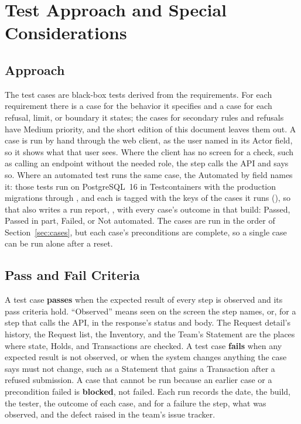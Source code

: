 \section{Test Approach and Special Considerations}\label{sec:approach}

\subsection{Approach}
The test cases are black-box tests derived from the requirements. For each requirement there is a case for the behavior it specifies and a case for each refusal, limit, or boundary it states; the cases for secondary rules and refusals have Medium priority, and the short edition of this document leaves them out. A case is run by hand through the web client, as the user named in its Actor field, so it shows what that user sees. Where the client has no screen for a check, such as calling an endpoint without the needed role, the step calls the API and says so. Where an automated test runs the same case, the Automated by field names it: those tests run on PostgreSQL~16 in Testcontainers with the production migrations through , and each is tagged with the keys of the cases it runs (), so that  also writes a run report, , with every case's outcome in that build: Passed, Passed in part, Failed, or Not automated. The cases are run in the order of Section~\ref{sec:cases}, but each case's preconditions are complete, so a single case can be run alone after a reset.

\subsection{Pass and Fail Criteria}
A test case \textbf{passes} when the expected result of every step is observed and its pass criteria hold. ``Observed'' means seen on the screen the step names, or, for a step that calls the API, in the response's status and body. The Request detail's history, the Request list, the Inventory, and the Team's Statement are the places where state, Holds, and Transactions are checked. A test case \textbf{fails} when any expected result is not observed, or when the system changes anything the case says must not change, such as a Statement that gains a Transaction after a refused submission. A case that cannot be run because an earlier case or a precondition failed is \textbf{blocked}, not failed. Each run records the date, the build, the tester, the outcome of each case, and for a failure the step, what was observed, and the defect raised in the team's issue tracker.


